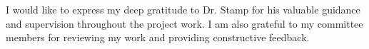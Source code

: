 I would like to express my deep gratitude to Dr. Stamp for his valuable guidance
and supervision throughout the project work. I am also grateful to my committee
members for reviewing my work and providing constructive feedback.